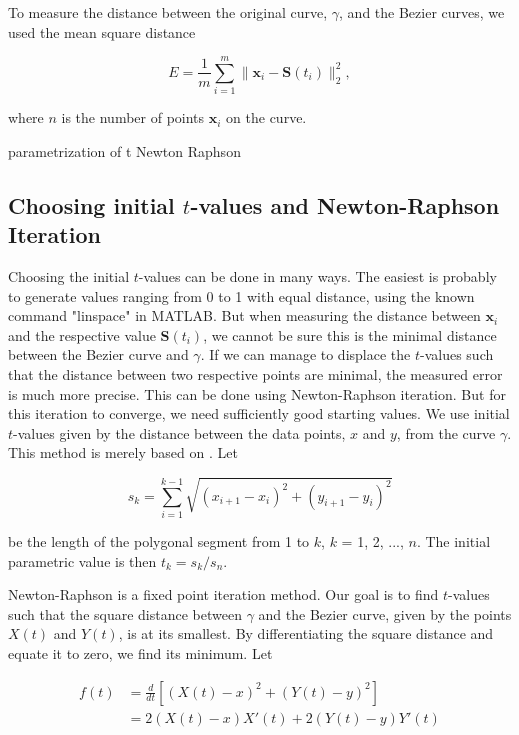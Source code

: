 \documentclass[10pt]{article}
\begin{document}
To measure the distance between the original curve, $\gamma$, and the Bezier curves, we used the mean square distance 

\begin{equation}
E = \frac{1}{m} \sum_{i=1}^{m} \|\mathbf{x}_i - \mathbf{S}(t_i)\|^2_2,
\end{equation}

where $n$ is the number of points $\mathbf{x}_i$ on the curve. 

parametrization of t
Newton Raphson

\subsection*{Choosing initial $t$-values and Newton-Raphson Iteration}

Choosing the initial $t$-values can be done in many ways. The easiest is probably to generate values ranging from 0 to 1 with equal distance, using the known command "linspace" in MATLAB. But when measuring the distance between $\mathbf{x}_i$ and the respective value $\mathbf{S}(t_i)$, we cannot be sure this is the minimal distance between the Bezier curve and $\gamma$. If we can manage to displace the $t$-values such that the distance between two respective points are minimal, the measured error is much more precise. This can be done using Newton-Raphson iteration. But for this iteration to converge, we need sufficiently good starting values. We use initial $t$-values given by the distance between the data points, $x$ and $y$, from the curve $\gamma$. This method is merely based on \cite{Plass:1983}. Let

\begin{equation}
s_k = \sum_{i=1}^{k-1} \sqrt{(x_{i+1}-x_i)^2 + (y_{i+1}-y_i)^2}
\end{equation}

be the length of the polygonal segment from 1 to $k$, $k$ = 1, 2, ..., $n$. The initial parametric value is then $t_k = s_k/s_n$.

Newton-Raphson is a fixed point iteration method. Our goal is to find $t$-values such that the square distance between $\gamma$ and the Bezier curve, given by the points $X(t)$ and $Y(t)$, is at its smallest. By  differentiating the square distance and equate it to zero, we find its minimum. Let

\begin{align}
f(t) &= \frac{d}{dt} [(X(t)-x)^2 + (Y(t)-y)^2 ] \\
&= 2(X(t)-x)X'(t) + 2(Y(t)-y)Y'(t)
\end{align}
\end{document}
